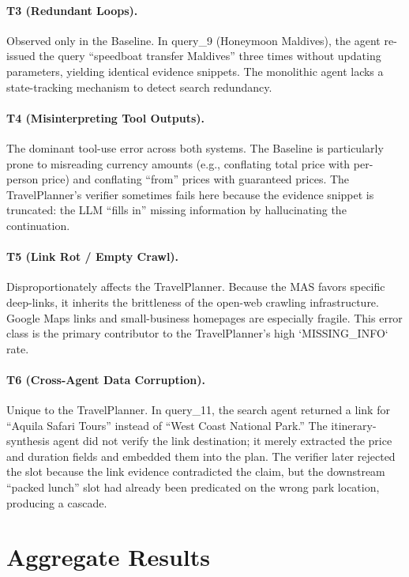 \documentclass[a4paper,oneside,bibliography=totoc]{scrbook}
\begin{document}
\paragraph{T3 (Redundant Loops).} Observed only in the Baseline. In query\_9 (Honeymoon Maldives), the agent re-issued the query ``speedboat transfer Maldives'' three times without updating parameters, yielding identical evidence snippets. The monolithic agent lacks a state-tracking mechanism to detect search redundancy.

\paragraph{T4 (Misinterpreting Tool Outputs).} The dominant tool-use error across both systems. The Baseline is particularly prone to misreading currency amounts (e.g., conflating total price with per-person price) and conflating ``from'' prices with guaranteed prices. The TravelPlanner's verifier sometimes fails here because the evidence snippet is truncated: the LLM ``fills in'' missing information by hallucinating the continuation.

\paragraph{T5 (Link Rot / Empty Crawl).} Disproportionately affects the TravelPlanner. Because the MAS favors specific deep-links, it inherits the brittleness of the open-web crawling infrastructure. Google Maps links and small-business homepages are especially fragile. This error class is the primary contributor to the TravelPlanner's high `MISSING\_INFO` rate.

\paragraph{T6 (Cross-Agent Data Corruption).} Unique to the TravelPlanner. In query\_11, the search agent returned a link for ``Aquila Safari Tours'' instead of ``West Coast National Park.'' The itinerary-synthesis agent did not verify the link destination; it merely extracted the price and duration fields and embedded them into the plan. The verifier later rejected the slot because the link evidence contradicted the claim, but the downstream ``packed lunch'' slot had already been predicated on the wrong park location, producing a cascade.

\section{Aggregate Results}
\label{sec:results}
\end{document}
